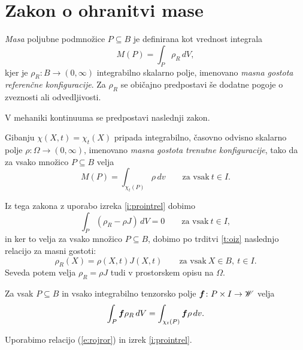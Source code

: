 \section{Zakon o ohranitvi mase}


\emph{Masa} poljubne podmnožice $P\subseteq B$ je definirana kot vrednost integrala
\[ M(P)=\int_P\rho_R\,dV, \]
kjer je $\rho_R\colon B\to(0,\infty)$ integrabilno skalarno polje, imenovano
\emph{masna gostota referenčne konfiguracije}.
Za $\rho_R$ se običajno predpostavi še dodatne pogoje o zveznosti ali odvedljivosti.

\begin{comment}
Poljubni konfiguraciji materialnega telesa $\kappa\colon B\to\E$ pripada
integrabilno skalarno polje $\rho_{\kappa}\colon B\to(0,\infty)$, imenovano
\emph{masna gostota konfiguracije $\kappa$}, tako da za vsako množico $P\subseteq B$ velja
\[ M(P)=\int_{\kappa(P)}\rho_{\kappa}\,dv. \]
\end{comment}

V mehaniki kontinuuma se predpostavi naslednji zakon.
\begin{aksiom}
	Gibanju $\chi(X,t)=\chi_t(X)$ pripada integrabilno, časovno odvisno skalarno polje
	$\rho\colon\Omega\to(0,\infty)$, imenovano \emph{masna gostota trenutne konfiguracije},
	tako da za vsako množico $P\subseteq B$ velja
	\[ M(P)=\int_{\chi_t(P)}\rho\,dv\qquad\textrm{za vsak}\ t\in I. \]
\end{aksiom}

Iz tega zakona z uporabo izreka \ref{i:prointrel} dobimo
\[ \int_{P}(\rho_R-\rho J)\,dV=0 \qquad\textrm{za vsak}\ t\in I, \]
in ker to velja za vsako množico $P\subseteq B$, dobimo po trditvi \ref{t:oiz}
naslednjo relacijo za masni gostoti:
\begin{equation} \label{e:rojror}
	\rho_R(X)=\rho(X,t)J(X,t)\qquad\textrm{za vsak}\ X\in B,\ t\in I.
\end{equation}
Seveda potem velja $\rho_R=\rho J$ tudi v prostorskem opisu na $\Omega$.

\begin{posledica} \label{p:roji}
	Za vsak $P\subseteq B$ in vsako
	integrabilno tenzorsko polje $\boldsymbol f\colon P\times I\to\mathscr W$ velja
	\[
		\int_{P}\boldsymbol f\rho_R\,dV=\int_{\chi_t(P)}\boldsymbol f\rho\,dv.
	\]
\end{posledica}

\proof
	Uporabimo relacijo (\ref{e:rojror}) in izrek \ref{i:prointrel}.
\endproof

